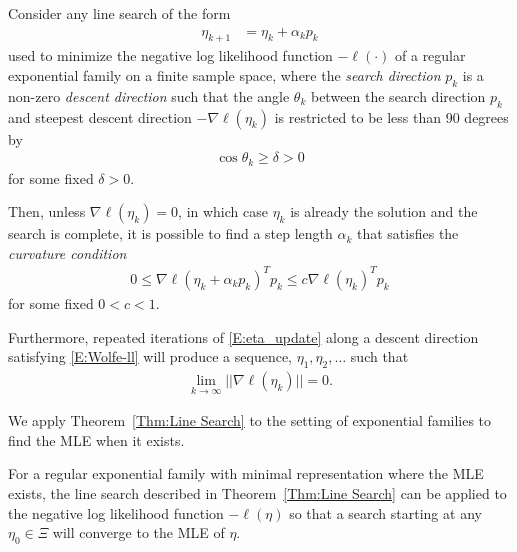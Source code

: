 \begin{theorem} \label{Thm:log like 
max}
Consider any line search of the form 
\begin{align}
	\eta_{k+1} &= \eta_k + \alpha_k p_k \label{E:eta_update}
\end{align}
used to minimize the negative log likelihood function $-\ell(\cdot)$ of a regular 
exponential family on a finite sample space, where the \emph{search direction} $p_k$ 
is a non-zero \emph{descent direction}
such that the angle $\theta_k$ between the search direction $p_k$ and steepest descent 
direction $-\nabla \ell(\eta_k)$ is 
restricted to be less than 90 degrees by
\begin{align*}
\cos \theta_k \geq \delta > 0
\end{align*}
 for some fixed $\delta > 0$.  

Then, unless $\nabla \ell(\eta_k) = 0$, in which case $\eta_k$ is already the solution 
and the search is complete, it is 
possible to find a step length $\alpha_k$ that satisfies the \emph{curvature 
condition}
\begin{align}
	0 \leq \nabla \ell( \eta_k + \alpha_k p_k)^T p_k  \leq c \nabla \ell(\eta_k)^T p_k  
\label{E:Wolfe-ll}
\end{align}
for some fixed $0 < c < 1$.

Furthermore, repeated iterations of \eqref{E:eta_update} along a descent direction 
satisfying \eqref{E:Wolfe-ll} will produce a sequence, $\eta_1, \eta_2, \ldots$ such 
that
\begin{align*}
	\lim_{k \to \infty} || \nabla \ell(\eta_k) || = 0.
\end{align*}
\end{theorem}



We apply Theorem~\ref{Thm:Line Search} to the setting of exponential families to find 
the MLE when it exists.  

\begin{theorem}[] \label{Thm:Line Search works}
For a regular exponential family with minimal representation where the MLE exists, the 
line search described in 
Theorem~\ref{Thm:Line Search} can be applied to the negative log likelihood function 
$-\ell(\eta)$ so that a search 
starting at any $\eta_0 \in \Xi$ will converge to the MLE of $\eta$.
\end{theorem}

